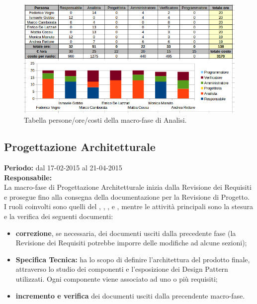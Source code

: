 \begin{figure}[h]
\begin{center}
\includegraphics[scale=0.50]{img/analisi-personeorecosti.png}
\caption{Tabella persone/ore/costi della macro-fase di Analisi.}
\end{center}
\end{figure}

\newpage
\subsection{Progettazione Architetturale}
\textbf{Periodo:} dal 17-02-2015 al 21-04-2015 \\
\textbf{Responsabile:} \GoIs \\
La macro-fase di Progettazione Architetturale inizia dalla Revisione dei Requisiti e prosegue fino alla consegna della documentazione per la Revisione di Progetto. \\
I ruoli coinvolti sono quelli del \ruoloResponsabile{}, \ruoloAmministratore{}, \ruoloAnalista{}, \ruoloProgettista{} e \ruoloVerificatore{}, mentre le attività principali sono la stesura e la verifica dei seguenti documenti:

\begin{itemize}
\item \textbf{correzione}, se necessaria, dei documenti usciti dalla precedente fase (la Revisione dei Requisiti potrebbe imporre delle modifiche ad alcune sezioni);
\item \textbf{Specifica Tecnica:} ha lo scopo di definire l'architettura del prodotto finale,  attraverso lo studio dei componenti e l'esposizione dei Design Pattern utilizzati. Ogni componente viene associato ad uno o più requisiti;
\item \textbf{incremento e verifica} dei documenti usciti dalla precendente macro-fase.
\end{itemize}

